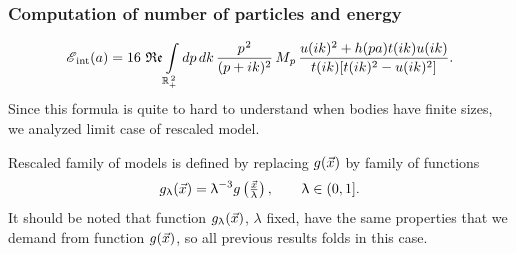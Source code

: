 \documentclass[10pt,t]{beamer}
\begin{document}
\begin{frame}
  \frametitle{Computation of number of particles and energy}


  \begin{equation}
    \label{eq:Energia-i-liczba-czastek-dla-modelu-ETC-34}
    \mathcal{E}_{ \, \textrm{int}}( a ) =
    16 \, \operatorname{\mathfrak{Re}} \int\limits_{ \mathbb{R}_{ + }^{ \, 2 } } dp \, dk \,
    \frac{ p^{ \hspace{0.05em} 2 } }{ ( p + i k )^{ 2 } } \, M_{ \hspace{0.05em} p } \,
    \frac{ u( i k )^{ 2 } + h( p a ) t( i k ) u( i k ) }{
      t( i k ) [ t( i k )^{ 2 } - u( i k )^{ 2 } ] }.
  \end{equation}
  Since this formula is quite to hard to understand when bodies have finite
  sizes, we analyzed limit case of rescaled model.

  Rescaled family of models is defined by replacing $g( \vec{x} )$ by family
  of functions
  \begin{equation}
    \label{eq:Energia-i-liczba-czastek-dla-modelu-ETC-34}
    g_{ \uplambda }( \vec{x} ) =
    \uplambda^{ -3 } g\left( \tfrac{ \vec{x} }{ \uplambda } \right), \qquad
    \uplambda \in ( 0, 1 ].
  \end{equation}
  It should be noted that function $g_{ \uplambda }( \vec{x} )$, $\lambda$ fixed, have the
  same properties that we demand from function $g( \vec{x} )$, so all
  previous results folds in this case.

\end{frame}
\end{document}
